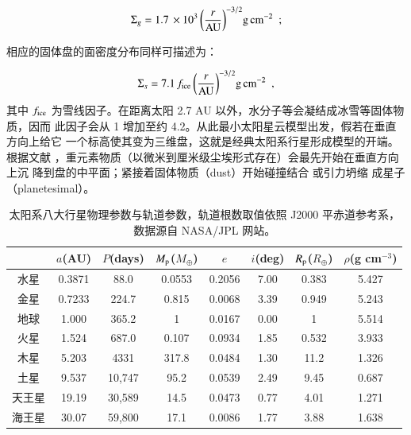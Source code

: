 \begin{equation} \label{eq:mmsng}
\Sigma_g = 1.7 \,\times10^3 \, \bigg(\frac{r}{\tif{AU}}\bigg)^{-3/2}  \tif{g} \,\tif{cm}^{-2} \ \ ; 
\end{equation} %

相应的固体盘的面密度分布同样可描述为：

\begin{equation} \label{eq:mmsns}
\Sigma_s = 7.1 \, f_\tif{ice} \, \bigg(\frac{r}{\tif{AU}}\bigg)^{-3/2}  \tif{g} \,\tif{cm}^{-2} \ \ ,
\end{equation} %
其中 $f_\mathrm{ice}$ 为雪线因子。在距离太阳 2.7 AU 以外，水分子等会凝结成冰雪等固体物质，因而
此因子会从 1 增加至约 4.2\cite{IdaLin2004}。从此最小太阳星云模型出发，假若在垂直方向上给它
一个标高使其变为三维盘，这就是经典太阳系行星形成模型的开端。根据文献 
，重元素物质（以微米到厘米级尘埃形式存在）会最先开始在垂直方向上沉
降到盘的中平面；紧接着固体物质（dust）开始碰撞结合
\cite{ppvibook2014,Weidenschilling1997,BlumWurm2008}或引力坍缩
\cite{Safronov1972,GoldreichWard1973,YoudinShu2002,ChiangYoudin2010}成星子（planetesimal）。

\begin{table}[t]
\centering
\caption{太阳系八大行星物理参数与轨道参数，轨道根数取值依照 J2000 平赤道参考系，数据源自 NASA/JPL 网站。}
\label{tbl:solarsystem}
\begin{tabular}{cccccccc}
\hline \hline
  & $a$(AU) & $P$(days) & $M_\mathrm{p}$($M_\oplus$) &  $e$ &  $i$(deg) &  $R_\mathrm{p}$($R_\oplus$) & $\rho$(g cm$^{-3}$) \\ \hline
水星        &   0.3871    &   88.0      &  0.0553    & 0.2056  &  7.00    &   0.383   &   5.427      \\
金星        &   0.7233    &   224.7    &  0.815      & 0.0068  &  3.39    &   0.949   &   5.243      \\
地球        &   1.000      &   365.2     &  1            & 0.0167 &   0.00    &   1          &   5.514      \\
火星        &   1.524      &   687.0     &  0.107     & 0.0934 &   1.85    &   0.532   &   3.933      \\
木星        &   5.203      &   4331      &  317.8     & 0.0484  &  1.30    &   11.2     &   1.326      \\
土星        &    9.537     &   10,747   &  95.2       & 0.0539 &    2.49   &   9.45     &   0.687      \\
天王星     &   19.19     &    30,589   &  14.5       & 0.0473 &   0.77    &   4.01     &  1.271       \\
海王星     &   30.07     &    59,800   &  17.1       & 0.0086 &    1.77   &    3.88    &  1.638       \\
\hline \hline
\end{tabular}
\end{table}

